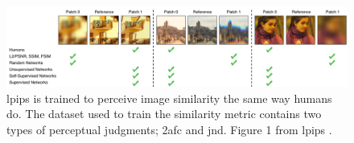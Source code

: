 \begin{figure}[ht]
    \centering
    \includegraphics[width=1.0\textwidth]{figures/lpips.png}
    \caption[LPIPS - Learned Perceptual Image Patch Similarity]{\acrshort{lpips} is trained to perceive image similarity the same way humans do. The dataset used to train the similarity metric contains two types of perceptual judgments; \acrshort{2afc} and \acrshort{jnd}. Figure 1 from \acrshort{lpips} \cite{zhang_unreasonable_2018}.}
    \label{fig:lpips}
\end{figure}

